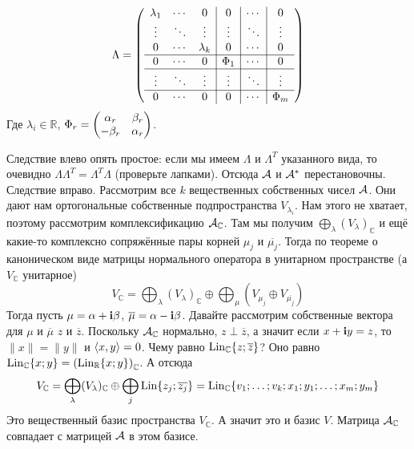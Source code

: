 \documentclass{article}
\begin{document}
\begin{itemize}
        $$
        \Lambda=\arr{ccc|c|c|c}{
            \lambda_1 & \cdots & 0 & 0 & \cdots & 0\\
            \vdots & \ddots & \vdots & \vdots & \ddots & \vdots\\
            0 & \cdots & \lambda_k & 0 & \cdots & 0\\
            \hline
            0 & \cdots & 0 & \Phi_1 & \cdots & 0\\
            \hline
            \vdots & \ddots & \vdots & \vdots & \ddots & \vdots\\
            \hline
            0 & \cdots & 0 & 0 & \cdots & \Phi_m\\
        }
        $$
        Где $\lambda_i\in\mathbb R$, $\Phi_r=\matr{\alpha_r & \beta_r\\-\beta_r & \alpha_r}$.
        \begin{Proof}
            Следствие влево опять простое: если мы имеем $\Lambda$ и $\Lambda^T$ указанного вида, то очевидно $\Lambda\Lambda^T=\Lambda^T\Lambda$ (проверьте лапками). Отсюда $\scriptA$ и $\scriptA^*$ перестановочны.\\
            Следствие вправо. Рассмотрим все $k$ вещественных собственных чисел $\scriptA$. Они дают нам ортогональные собственные подпространства $V_{\lambda_i}$. Нам этого не хватает, поэтому рассмотрим комплексификацию $\scriptA_{\mathbb C}$. Там мы получим $\bigoplus_\lambda(V_\lambda)_{\mathbb C}$ и ещё какие-то комплексно сопряжённые пары корней $\mu_j$ и $\overline{\mu_j}$. Тогда по теореме о каноническом виде матрицы нормального оператора в унитарном пространстве (а $V_{\mathbb C}$ унитарное)
            $$V_{\mathbb C}=\bigoplus_\lambda(V_\lambda)_{\mathbb C}\oplus\bigoplus_\mu(V_{\mu_j}\oplus V_{\overline{\mu_j}})$$
            Тогда пусть $\mu=\alpha+\im\beta$, $\overline\mu=\alpha-\im\beta$. Давайте рассмотрим собственные вектора для $\mu$ и $\overline\mu$ $z$ и $\overline z$. Поскольку $\scriptA_{\mathbb C}$ нормально, $z\perp\overline z$, а значит если $x+\im y=z$, то $\|x\|=\|y\|$ и $\dotprod xy=0$. Чему равно $\Lin_{\mathbb C}\{z;\overline z\}$? Оно равно $\Lin_{\mathbb C}\{x;y\}=\left(\Lin_{\mathbb R}\{x;y\}\right)_{\mathbb C}$. А отсюда
            $$
            V_\mathbb C=\bigoplus_\lambda(V_\lambda)_{\mathbb C}\oplus\bigoplus_j\Lin\{z_j;\overline{z_j}\}=\Lin_{\mathbb C}\{v_1;\ldots;v_k;x_1;y_1;\ldots;x_m;y_m\}
            $$
            Это вещественный базис пространства $V_{\mathbb C}$. А значит это и базис $V$. Матрица $\scriptA_{\mathbb C}$ совпадает с матрицей $\scriptA$ в этом базисе.\\

\end{Proof}
\end{itemize}
\end{document}
